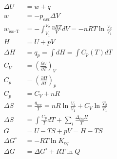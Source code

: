 \begin{align*}
\Delta U &= w + q\\
w&=-p_{ext}\Delta V\\
w_{\textrm{iso-T}}&=-\int_{V_1}^{V_2}\frac{nRT}{V}dV=-nRT\ln\frac{V_2}{V_1}\\
H &= U + pV\\
\Delta H &= q_p = \int dH=\int C_p(T)dT\\
C_V&=\left(\frac{\partial U}{\partial T}\right)_V\\
C_p&=\left(\frac{\partial H}{\partial T}\right)_p\\
C_p&=C_V+nR\\
\Delta S &= \frac{q_{rev}}{T}= nR\ln \frac{V_2}{V_1} + C_V \ln \frac{T_2}{T_1}\\
\Delta S &= \int \frac{C_p}{T} dT + \sum_i\frac{\Delta_{trs} H}{T}\\
G& = U - TS + pV = H -TS\\ %
\Delta G^{\circ} &= -RT\ln{K_{eq}}\\
\Delta G &= \Delta G^{\circ} + RT\ln{Q}\\
\end{align*}
